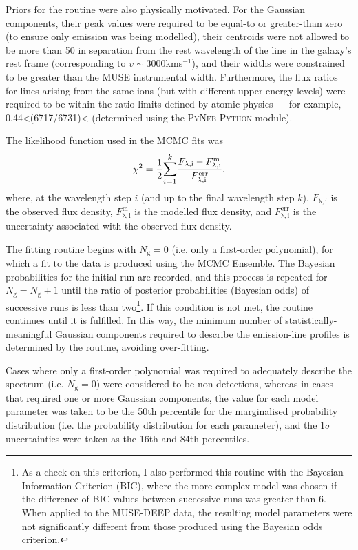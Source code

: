 Priors for the routine were also physically motivated. For the Gaussian components, their peak values were required to be equal-to or greater-than zero (to ensure only emission was being modelled), their centroids were not allowed to be more than 50\;{\AA} in separation from the rest wavelength of the line in the galaxy's rest frame (corresponding to $v\sim3000$\;km\;s$^{-1}$), and their widths were constrained to be greater than the MUSE instrumental width. Furthermore, the flux ratios for lines arising from the same ions (but with different upper energy levels) were required to be within the ratio limits defined by atomic physics --- for example, 0.44\;\textless\;[SII](6717/6731)\;\textless{} (determined using the \textsc{PyNeb Python} module). 

The likelihood function used in the MCMC fits was
\begin{equation}
    \chi^2=\frac{1}{2}\mathlarger{\sum^k_{i=1}}\frac{F_\mathrm{\lambda,i}-F^\mathrm{m}_\mathrm{\lambda,i}}{F^\mathrm{err}_\mathrm{\lambda,i}},
    \label{eq: muse_f13451_1232: analysis_and_results: chisq}
\end{equation}
where, at the wavelength step $i$ (and up to the final wavelength step $k$), $F_\mathrm{\lambda,i}$ is the observed flux density, $F^\mathrm{m}_\mathrm{\lambda,i}$ is the  modelled flux density, and ${F^\mathrm{err}_\mathrm{\lambda,i}}$ is the uncertainty associated with the observed flux density.

The fitting routine begins with $N_\mathrm{g}=0$ (i.e. only a first-order polynomial), for which a fit to the data is produced using the MCMC Ensemble. The Bayesian probabilities for the initial run are recorded, and this process is repeated for $N_\mathrm{g}=N_\mathrm{g}+1$ until the ratio of posterior probabilities (Bayesian odds) of successive runs is less than two\footnote{As a check on this criterion, I also performed this routine with the Bayesian Information Criterion (BIC), where the more-complex model was chosen if the difference of BIC values between successive runs was greater than 6. When applied to the MUSE-DEEP data, the resulting model parameters were not significantly different from those produced using the Bayesian odds criterion.}. If this condition is not met, the routine continues until it is fulfilled. In this way, the minimum number of statistically-meaningful Gaussian components required to describe the emission-line profiles is determined by the routine, avoiding over-fitting. 

Cases where only a first-order polynomial was required to adequately describe the spectrum (i.e. $N_\mathrm{g}=0$) were considered to be non-detections, whereas in cases that required one or more Gaussian components, the value for each model parameter was taken to be the 50th percentile for the marginalised probability distribution (i.e. the probability distribution for each parameter), and the $1\sigma$ uncertainties were taken as the 16th and 84th percentiles.

